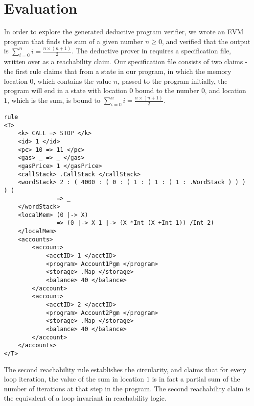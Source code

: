 \section{Evaluation}
In order to explore the generated deductive program verifier, we wrote an EVM
program that finds the sum of a given number $n \geq 0 $, and verified that the
output is $ \sum_{i = 0}^{n} i =  \frac{n \times  (n + 1 )}{2}$. The deductive
prover in \K{} requires a specification file, written over as a reachability
claim. Our specification file consists of two claims - the first rule claims
that from a state in our program, in which the memory location $0$, which
contains the value $n$, passed to the program initially, the program will end in
a state with location $0$ bound to the number $0$, and location $1$, which is
the sum, is bound to $ \sum_{i = 0}^{n} i = \frac{n \times  (n + 1 )}{2} $.

\begin{verbatim}
rule
<T> 
    <k> CALL => STOP </k> 
    <id> 1 </id> 
    <pc> 10 => 11 </pc> 
    <gas> _ => _ </gas>
    <gasPrice> 1 </gasPrice> 
    <callStack> .CallStack </callStack> 
    <wordStack> 2 : ( 4000 : ( 0 : ( 1 : ( 1 : ( 1 : .WordStack ) ) ) ) ) 
               => _ 
    </wordStack> 
    <localMem> (0 |-> X) 
               => (0 |-> X 1 |-> (X *Int (X +Int 1)) /Int 2) 
    </localMem>
    <accounts>
        <account>     
            <acctID> 1 </acctID> 
            <program> Account1Pgm </program>
            <storage> .Map </storage>
            <balance> 40 </balance> 
        </account>
        <account>
            <acctID> 2 </acctID> 
            <program> Account2Pgm </program>
            <storage> .Map </storage>
            <balance> 40 </balance> 
        </account>
    </accounts>
</T>
\end{verbatim}

The second reachability rule establishes the circularity, and claims that for
every loop iteration, the value of the sum in location $1$ is in fact a partial
sum of the number of iterations at that step in the program. The second
reachability claim is the equivalent of a loop invariant in reachability logic.

